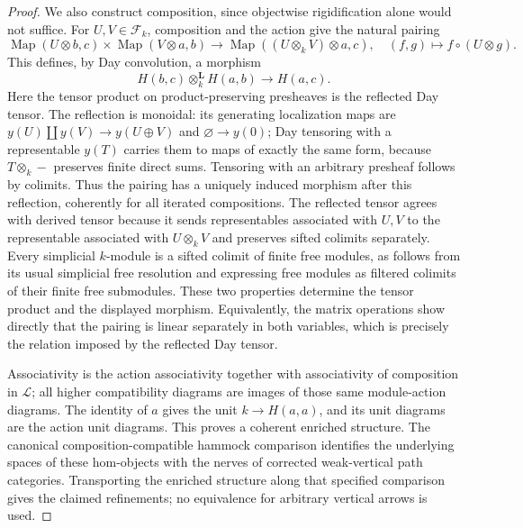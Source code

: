 \begin{proof}
We also construct composition, since objectwise rigidification alone would not suffice. For $U,V\in\mathcal F_k$, composition and the action give the natural pairing
\[
 \operatorname{Map}(U\otimes b,c)\times\operatorname{Map}(V\otimes a,b)
 \longrightarrow\operatorname{Map}((U\otimes_kV)\otimes a,c),
 \quad(f,g)\longmapsto f\circ(U\otimes g).
\]
This defines, by Day convolution, a morphism
\[
 H(b,c)\otimes_k^{\mathbf L}H(a,b)\longrightarrow H(a,c).
\]
Here the tensor product on product-preserving presheaves is the reflected Day tensor. The reflection is monoidal: its generating localization maps are $y(U)\amalg y(V)\to y(U\oplus V)$ and $\varnothing\to y(0)$; Day tensoring with a representable $y(T)$ carries them to maps of exactly the same form, because $T\otimes_k-$ preserves finite direct sums. Tensoring with an arbitrary presheaf follows by colimits. Thus the pairing has a uniquely induced morphism after this reflection, coherently for all iterated compositions. The reflected tensor agrees with derived tensor because it sends representables associated with $U,V$ to the representable associated with $U\otimes_kV$ and preserves sifted colimits separately. Every simplicial $k$-module is a sifted colimit of finite free modules, as follows from its usual simplicial free resolution and expressing free modules as filtered colimits of their finite free submodules. These two properties determine the tensor product and the displayed morphism. Equivalently, the matrix operations show directly that the pairing is linear separately in both variables, which is precisely the relation imposed by the reflected Day tensor.

Associativity is the action associativity together with associativity of composition in $\mathcal L$; all higher compatibility diagrams are images of those same module-action diagrams. The identity of $a$ gives the unit $k\to H(a,a)$, and its unit diagrams are the action unit diagrams. This proves a coherent enriched structure. The canonical composition-compatible hammock comparison identifies the underlying spaces of these hom-objects with the nerves of corrected weak-vertical path categories. Transporting the enriched structure along that specified comparison gives the claimed refinements; no equivalence for arbitrary vertical arrows is used.
\end{proof}

